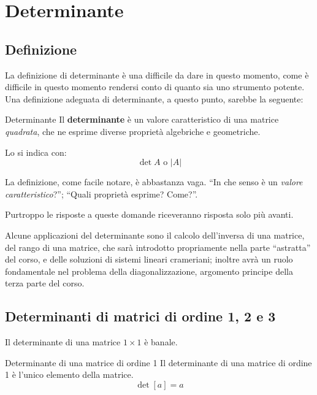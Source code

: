\chapter{Determinante}
\section{Definizione}
La definizione di determinante è una difficile da dare in questo momento, come è difficile in questo momento rendersi conto di quanto sia uno strumento potente. Una definizione adeguata di determinante, a questo punto, sarebbe la seguente:
\begin{newdef}{Determinante}
    Il \textbf{determinante} è un valore caratteristico di una matrice \textit{quadrata}, che ne esprime diverse proprietà algebriche e geometriche.

    Lo si indica con:
    \[
        \det A \text{ o } |A|
    \]
\end{newdef}
La definizione, come facile notare, è abbastanza vaga. ``In che senso è un \textit{valore caratteristico}?''; ``Quali proprietà esprime? Come?''.

Purtroppo le risposte a queste domande riceveranno risposta solo più avanti.

Alcune applicazioni del determinante sono il calcolo dell'inversa di una matrice, del rango di una matrice, che sarà introdotto propriamente nella parte ``astratta'' del corso, e delle soluzioni di sistemi lineari crameriani; inoltre avrà un ruolo fondamentale nel problema della diagonalizzazione, argomento principe della terza parte del corso.

\section{Determinanti di matrici di ordine 1, 2 e 3}
Il determinante di una matrice $1 \times 1$ è banale.

\begin{teo}{Determinante di una matrice di ordine 1}
    Il determinante di una matrice di ordine 1 è l'unico elemento della matrice.
    \[
        \det[a] = a
    \]
\end{teo}

